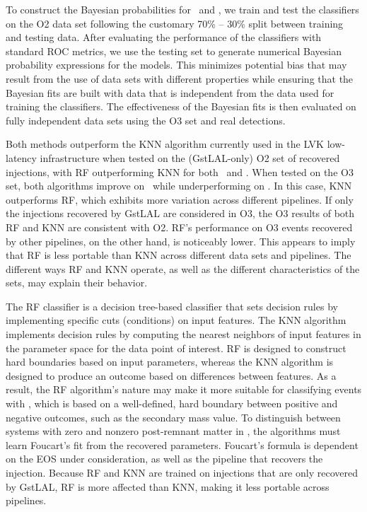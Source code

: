 To construct the Bayesian probabilities for \hasns\ and \hasrem, we train and test the classifiers on the \ac{O2} data set following the customary 70\% -- 30\% split between
training and testing data. After evaluating the performance of the classifiers with standard \ac{ROC} metrics, we use the testing set to generate numerical Bayesian probability
expressions for the models. This minimizes potential bias that may result from the use of data sets with different properties while ensuring that the Bayesian fits are built with
data that is independent from the data used for training the classifiers. The effectiveness of the Bayesian fits is then evaluated on fully independent data sets using the
\ac{O3} set and real detections. 


Both methods outperform the \ac{KNN} algorithm currently used in the \ac{LVK} low-latency infrastructure when tested on the (GstLAL-only) \ac{O2} set of recovered injections, with
\ac{RF} outperforming \ac{KNN} for both \hasns\ and \hasrem. When tested on the \ac{O3} set, both algorithms improve on \hasns\ while underperforming on \hasrem.  In this case,
\ac{KNN} outperforms \ac{RF}, which exhibits more variation across different pipelines.  If only the injections recovered by GstLAL are considered in \ac{O3}, the \ac{O3} results of
both \ac{RF} and \ac{KNN} are consistent with \ac{O2}. \ac{RF}'s performance on \ac{O3} events recovered by other pipelines, on the other hand, is noticeably lower. This appears to
imply that \ac{RF} is less portable than \ac{KNN} across different data sets and pipelines. The different ways \ac{RF} and \ac{KNN} operate, as well as the different characteristics
of the sets, may explain their behavior.

The RF classifier is a decision tree-based classifier that sets decision rules by implementing specific cuts (conditions) on input features. The \ac{KNN} algorithm implements decision rules by computing the nearest neighbors of input features in the parameter space for the data point of interest. \ac{RF} is designed to construct hard boundaries based on input parameters, whereas the \ac{KNN} algorithm is designed to produce an outcome based on differences between features. As a result, the \ac{RF} algorithm's nature may make it more suitable for classifying events with \hasns, which is based on a well-defined, hard boundary between positive and negative outcomes, such as the secondary mass value. To distinguish between systems with zero and nonzero post-remnant matter in \hasrem, the algorithms must learn Foucart's fit from the recovered parameters. Foucart's formula is dependent on the \ac{EOS} under consideration, as well as the pipeline that recovers the injection. Because \ac{RF} and \ac{KNN} are trained on injections that are only recovered by GstLAL, \ac{RF} is more affected than \ac{KNN}, making it less portable across pipelines.

